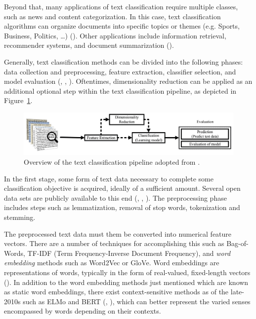\documentclass[english,bachelor,ul]{webisthesis} %
\begin{document}
Beyond that, many applications of text classification require multiple classes, such as news and content categorization. In this case, text classification algorithms can organize documents into specific topics or themes (e.g. Sports, Business, Politics, \dots) (\cite{DBLP:journals/csur/Sebastiani02}). Other applications include information retrieval, recommender systems, and document summarization (\cite{DBLP:journals/information/KowsariMHMBB19}).

Generally, text classification methods can be divided into the following phases: data collection and preprocessing, feature extraction, classifier selection, and model evaluation (\cite{DBLP:journals/information/KowsariMHMBB19}, \cite{DBLP:journals/eswa/MironczukP18}, \cite{ikonomakis2005text}). Oftentimes, dimensionality reduction can be applied as an additional optional step within the text classification pipeline, as depicted in Figure~\ref{fig:pipeline}.

\begin{figure}[htbp]
    \centering
    \includegraphics[width=1\textwidth]{img/pipeline.png}
    \caption{Overview of the text classification pipeline adopted from \cite{DBLP:journals/information/KowsariMHMBB19}.}
    \label{fig:pipeline}
\end{figure}

In the first stage, some form of text data necessary to complete some classification objective is acquired, ideally of a sufficient amount. Several open data sets are publicly available to this end (\cite{DBLP:conf/acl/PangL05}, \cite{DBLP:conf/nips/ZhangZL15}, \cite{DBLP:journals/nle/LiR06}). The preprocessing phase includes steps such as lemmatization, removal of stop words, tokenization and stemming. 

The preprocessed text data must them be converted into numerical feature vectors. There are a number of techniques for accomplishing this such as Bag-of-Words, TF-IDF (Term Frequency-Inverse Document Frequency), and \textit{word embedding} methods such as Word2Vec or GloVe. Word embeddings are representations of words, typically in the form of real-valued, fixed-length vectors (\cite{DBLP:journals/corr/abs-1901-09069}). In addition to the word embedding methods just mentioned which are known as static word embeddings, there exist context-sensitive methods as of the late-2010s such as ELMo and BERT (\cite{DBLP:conf/naacl/PetersNIGCLZ18}, \cite{DBLP:conf/naacl/DevlinCLT19}), which can better represent the varied senses encompassed by words depending on their contexts.
\end{document}
